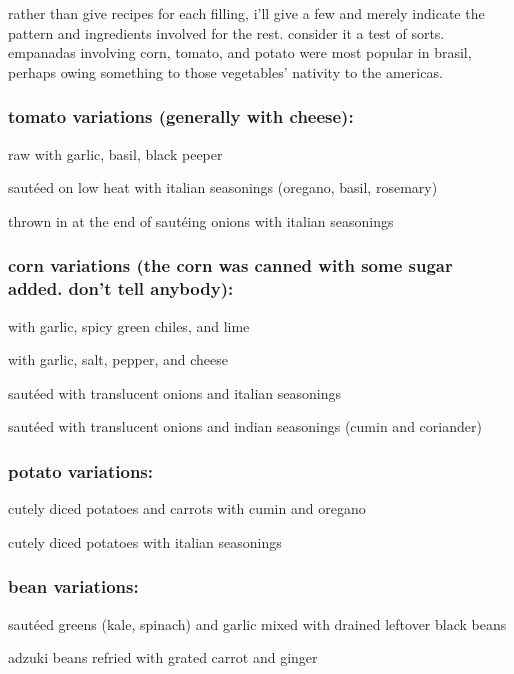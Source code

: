 rather than give recipes for each filling, i'll give a few and merely
indicate the pattern and ingredients involved for the rest. consider
it a test of sorts. empanadas involving corn, tomato, and potato were
most popular in brasil, perhaps owing something to those vegetables'
nativity to the americas.

\subsubsection{tomato variations (generally with cheese):}
\begin{ingredients}
  \item raw with garlic, basil, black peeper
  \item saut\'{e}ed on low heat with italian seasonings (oregano,
  basil, rosemary)
  \item thrown in at the end of saut\'{e}ing onions with italian seasonings
\end{ingredients}

\subsubsection{corn variations (the corn was canned with some sugar added. don't tell anybody):}
\begin{ingredients}
  \item with garlic, spicy green chiles, and lime
  \item with garlic, salt, pepper, and cheese
  \item saut\'{e}ed with translucent onions and italian seasonings
  \item saut\'{e}ed with translucent onions and indian seasonings (cumin and coriander)
\end{ingredients}

\subsubsection{potato variations:}
\begin{ingredients}
  \item cutely diced potatoes and carrots with cumin and oregano
  \item cutely diced potatoes with italian seasonings
\end{ingredients}

\subsubsection{bean variations:}
\begin{ingredients}
  \item saut\'{e}ed greens (kale, spinach) and garlic mixed with
  drained leftover black beans
  \item adzuki beans refried with grated carrot and ginger
\end{ingredients}

